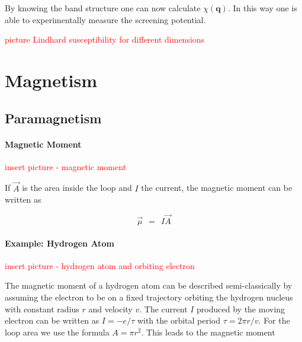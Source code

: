 \documentclass[10pt]{report}
\numberwithin{equation}{chapter}
\newcommand{\vc}[1]{ %
  \mathbf{#1}
}
\begin{document}
By knowing the band structure one can now calculate $\chi(\vc{q})$. In this way one is able to experimentally measure the screening potential.



\textcolor{red}{picture Lindhard susceptibility for different dimensions}







\chapter{Magnetism}

\section{Paramagnetism}

\subsubsection{Magnetic Moment}

\textcolor{red}{insert picture - magnetic moment}

If $\vec{A}$ is the area inside the loop and $I$ the current, the magnetic moment can be written as

\begin{equation} \label{eq:mag_mom}
  \vec{\mu} ~~=~~ I \vec{A}
\end{equation}


\subsubsection{Example: Hydrogen Atom}

\textcolor{red}{insert picture - hydrogen atom and orbiting electron}

The magnetic moment of a hydrogen atom can be described semi-classically by assuming the electron to be on a fixed trajectory orbiting the hydrogen nucleus with constant radius $r$ and velocity $v$. The current $I$ produced by the moving electron can be written as $I = -e/\tau$ with the orbital period $\tau = 2\pi r/v$. For the loop area we use the formula $A= \pi r^2$. This leads to the magnetic moment
\end{document}
